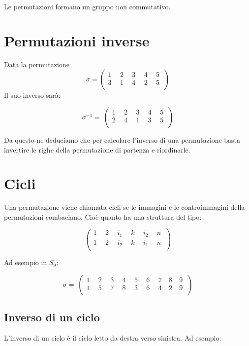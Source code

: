 \documentclass[a4paper, 10pt]{article}
\begin{document}
Le permutazioni formano un gruppo non commutativo.

\section{Permutazioni inverse}

Data la permutazione $$\sigma=\left(\begin{matrix}1\ &\ 2\ &\ 3\ &\ 4\ &\ 5\ \\3\ &\ 1\ &\ 4\ &\ 2\ &\ 5\ \\\end{matrix}\right)$$
Il suo inverso sarà:

$$\sigma^{-1}=\ \left(\begin{matrix}1\ &\ 2\ &\ 3\ &\ 4\ &\ 5\ \\2\ &\ 4\ &\ 1\ &\ 3\ &\ 5\ \\\end{matrix}\right)
$$

Da questo ne deduciamo che per calcolare l'inverso di una permutazione basta invertire le righe della permutazione di partenza e riordinarle.

\section{Cicli}

Una permutazione viene chiamata cicli se le immagini e le controimmagini della permutazioni combaciano. Cioè quanto ha una struttura del tipo:

$$\left(\begin{matrix}1\ &\ 2\ &\ i_1\ &\ k\ &\ i_2\ &\ n\ \\1\ &\ 2\ &\ i_2\ &\ k\ &\ i_1\ &\ n\ \\\end{matrix}\right)
$$

Ad esempio in $S_9$:

$$\sigma=\ \left(\begin{matrix}1\ &\ 2\ &\ 3\ &\ 4\ &\ 5\ &\ 6\ &\ 7\ & 8\ & 9\
	 \\1\ &\ 5\ &\ 7\ &\ 8\ &\ 3\ &\ 6\ &\ 4\ & 2\ & 9\ \\\end{matrix}\right)$$
	 
\subsection{Inverso di un ciclo}

L'inverso di un ciclo è il ciclo letto da destra verso sinistra. Ad esempio:
\end{document}
